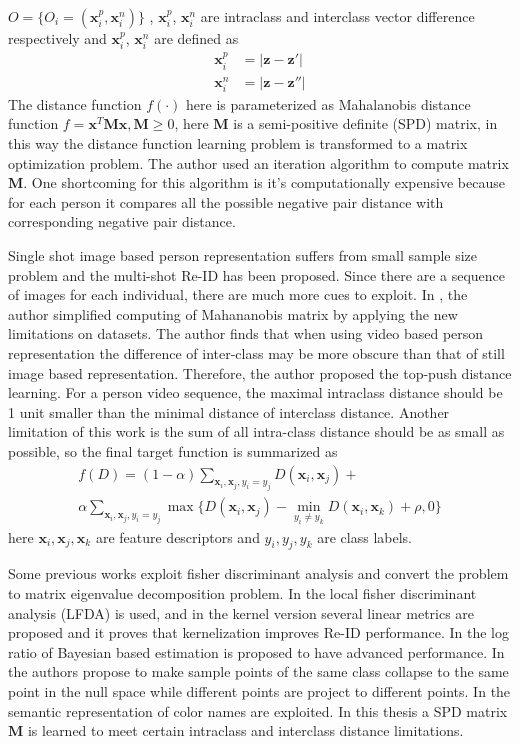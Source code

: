 $O=\{O_i=(\bm{x}_i^p, \bm{x}_i^n)\}$ , $\bm{x}_i^p$, $\bm{x}_i^n$ are intraclass and interclass vector difference respectively and $\bm{x}_i^p$, $\bm{x}_i^n$ are defined as
\begin{equation}
\begin{aligned}
\bm{x}_i^p &= |\bm{z} - \bm{z}'| \\
\bm{x}_i^n &= |\bm{z} - \bm{z}''| 
\end{aligned}
\end{equation}
The distance function $f(\cdot)$ here is parameterized as Mahalanobis distance function
$f=\bm{x}^T\bm{M}\bm{x},\bm{M\ge}0$,
here $\bm{M}$ is a semi-positive definite (SPD) matrix, in this way the distance function learning problem is transformed to a matrix optimization problem. The author used an iteration algorithm to compute matrix $\bm{M}$. One shortcoming for this algorithm is it's computationally expensive because for each person it compares all the possible negative pair distance with corresponding negative pair distance. 

Single shot image based person representation suffers from small sample size problem and the multi-shot Re-ID has been proposed. Since there are a sequence of images for each individual, there are much more cues to exploit.
In \cite{TDL}, the author simplified computing of Mahananobis matrix by applying the new limitations on datasets. The author finds that when using video based person representation the difference of inter-class may be more obscure than that of still image based representation. Therefore, the author proposed the top-push distance learning. For a person video sequence, the maximal intraclass distance should be 1 unit smaller than the minimal distance of interclass distance. Another limitation of this work is the sum of all intra-class distance should be as small as possible, so the final target function is summarized as 
\begin{equation}
\begin{aligned}
f(D) = (1-\alpha)\sum_{\bm{x}_i,\bm{x}_j,y_i=y_j} D(\bm{x}_i,\bm{x}_j) + \\
\alpha \sum_{\bm{x}_i,\bm{x}_j,y_i=y_j}\max\{{D(\bm{x}_i,\bm{x}_j)-\min_{y_i\ne y_k}{D(\bm{x}_i,\bm{x}_k)}+\rho,0}\}
\end{aligned}
\end{equation}
here $\bm{x}_i, \bm{x}_j, \bm{x}_k$ are feature descriptors and $y_i, y_j, y_k$ are class labels.

Some previous works exploit fisher discriminant analysis and convert the problem to matrix eigenvalue decomposition problem. In \cite{LFDA} the local fisher discriminant analysis (LFDA) is used, and in \cite{KernelVersionMetrics} the kernel version several linear metrics are proposed and it proves that kernelization improves Re-ID performance. In \cite{LOMO} the log ratio of Bayesian based estimation is proposed to have advanced performance. In \cite{NFST} the authors propose to make sample points of the same class collapse to the same point in the null space while different points are project to different points. In \cite{SCNCD} the semantic representation of color names are exploited. In this thesis a SPD matrix $\bm{M}$ is learned to meet certain intraclass and interclass distance limitations. 

